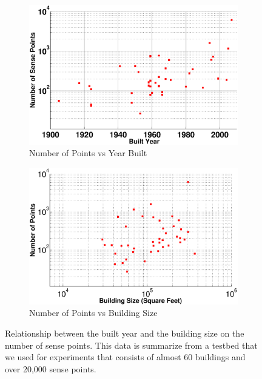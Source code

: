 \begin{figure}[ht]
\centering
	\begin{subfigure}{0.48\textwidth}
                \centering
		\includegraphics[width=\textwidth]{./figs/pts_vs_yearbuilt.eps}
                \caption{Number of Points vs Year Built}
                \label{fig:sense_pts_data_yb}
	\end{subfigure}
	\begin{subfigure}{0.48\textwidth}
                \centering
		\includegraphics[width=\textwidth]{./figs/pts_vs_buildsz.eps}
                \caption{Number of Points vs Building Size}
                \label{fig:sense_pts_data_bs}
	\end{subfigure}
\caption{Relationship between the built year and the building size on the number of sense
points.  This data is summarize from a testbed that we used for experiments that consists of
almost 60 buildings and over 20,000 sense points.}
\label{fig:sense_pts_data}
\end{figure}



